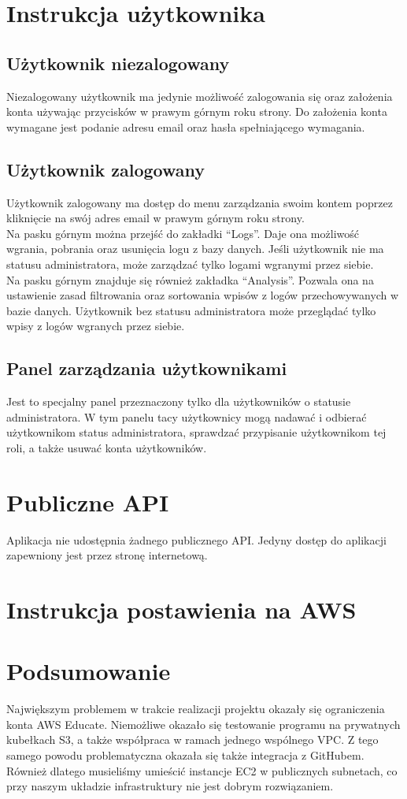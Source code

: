 \documentclass[12pt,a4paper]{article}
\begin{document}
    \section{Instrukcja użytkownika}
        \subsection{Użytkownik niezalogowany}
            Niezalogowany użytkownik ma jedynie możliwość zalogowania się oraz założenia konta używając przycisków w prawym górnym roku strony.
            Do założenia konta wymagane jest podanie adresu email oraz hasła spełniającego wymagania.
        \subsection{Użytkownik zalogowany}
            Użytkownik zalogowany ma dostęp do menu zarządzania swoim kontem poprzez kliknięcie na swój adres email w prawym górnym roku strony.\\
            Na pasku górnym można przejść do zakładki ``Logs''.
            Daje ona możliwość wgrania, pobrania oraz usunięcia logu z bazy danych.
            Jeśli użytkownik nie ma statusu administratora, może zarządzać tylko logami wgranymi przez siebie.\\
            Na pasku górnym znajduje się również zakładka ``Analysis''.
            Pozwala ona na ustawienie zasad filtrowania oraz sortowania wpisów z logów przechowywanych w bazie danych.
            Użytkownik bez statusu administratora może przeglądać tylko wpisy z logów wgranych przez siebie.
        \subsection{Panel zarządzania użytkownikami}
            Jest to specjalny panel przeznaczony tylko dla użytkowników o statusie administratora.
            W tym panelu tacy użytkownicy mogą nadawać i odbierać użytkownikom status administratora, sprawdzać przypisanie użytkownikom tej roli, a także usuwać konta użytkowników.
    \section{Publiczne API}
        Aplikacja nie udostępnia żadnego publicznego API.
        Jedyny dostęp do aplikacji zapewniony jest przez stronę internetową.
    \section{Instrukcja postawienia na AWS}
    \section{Podsumowanie}
        Największym problemem w trakcie realizacji projektu okazały się ograniczenia konta AWS Educate.
        Niemożliwe okazało się testowanie programu na prywatnych kubełkach S3, a także współpraca w ramach jednego wspólnego VPC.
        Z tego samego powodu problematyczna okazała się także integracja z GitHubem.
        Również dlatego musieliśmy umieścić instancje EC2 w publicznych subnetach, co przy naszym układzie infrastruktury nie jest dobrym rozwiązaniem.
\end{document}
